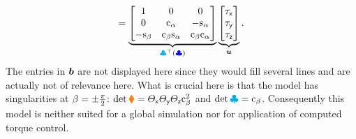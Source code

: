 \begin{multline}
 = \underbrace{\begin{bmatrix}
  1 & 0 & 0 \\
  0 & \crol & -\srol \\
  -\spit & \cpit \srol & \cpit \crol
 \end{bmatrix}}_{\kinBasisMat^\top(\genCoord)}
 \underbrace{\begin{bmatrix} \taux \\ \tauy \\ \tauz \end{bmatrix}}_{\sysInput}.
\end{multline}
The entries in $\sysForce$ are not displayed here since they would fill several lines and are actually not of relevance here.
What is crucial here is that the model has singularities at $\pit=\pm\tfrac{\pi}{2}$: $\det\sysInertiaMat = \Jx\Jy\Jz\cpit^2$ and $\det\kinBasisMat = \cpit$.
Consequently this model is neither suited for a global simulation nor for application of computed torque control.

